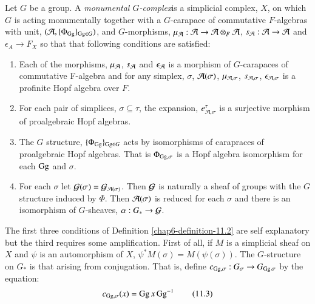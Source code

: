 \begin{definition}\label{chap6-definition-11.2}
Let $G$ be a group. A \textit{monumental $G$-complex}is a simplicial complex, $X$, on which $G$ is acting monumentally together with a $G$-carapace of commutative $F$-algebras with unit, $(\mathcal{A}, \{\Phi_{\operatorname{Gg}}\}_{\operatorname{Gg} \in G})$, and $G$-morphisms, $\mu_{\mathcal{A}} : \mathcal{A} \rightarrow \mathcal{A} \otimes_{F} \mathcal{A}$, $s_{\mathcal{A}} : \mathcal{A} \rightarrow \mathcal{A}$ and $\epsilon_{A} \rightarrow F_{X}$ so that that following conditions are satisfied:
\begin{enumerate}[{\rm(1)}]
\item Each of the morphisms, $\mu_{\mathcal{A}}$, $s_{\mathcal{A}}$ and $\epsilon_{\mathcal{A}}$ is a morphism of $G$-carapaces of commutative F-algebra and for any simplex, $\sigma$, $\mathcal{A}(\sigma)$, $\mu_{\mathcal{A}, \sigma}$, $s_{\mathcal{A}, \sigma}$, $\epsilon_{\mathcal{A}, \sigma}$ is a profinite Hopf algebra over $F$.\label{chap6-definition11.2-enum-1}

\item For each pair of simplices, $\sigma \subseteq \tau$, the expansion, $e_{\mathcal{A}, \sigma}^{\tau}$ is a surjective morphism of proalgebraic Hopf algebras.\label{chap6-definition11.2-enum-2}

\item The $G$ structure, $\{\Phi_{\operatorname{Gg}}\}_{\operatorname{Gg} \in G}$ acts by isomorphisms of carapraces of proalgebraic Hopf algebras. That is $\Phi_{\operatorname{Gg}, \sigma}$ is a Hopf algebra isomorphism for each $\operatorname{Gg}$ and $\sigma$.\label{chap6-definition11.2-enum-3}

\item For each $\sigma$ let $\mathcal{G}(\sigma) =\mathcal{G}_{\mathcal{A}(\sigma)}$. Then $\mathcal{G}$ is naturally a sheaf of groups with the $G$ structure induced by $\Phi$. Then $\mathcal{A}(\sigma)$ is reduced for each $\sigma$ and there is an isomorphism of $G$-sheaves, $\alpha : G_{*} \rightarrow \mathcal{G}$.\label{chap6-definition11.2-enum-4}
\end{enumerate}
\end{definition}

The first three conditions of Definition \ref{chap6-definition-11.2} are self explanatory but the third requires some amplification. First of all, if $M$ is a simplicial sheaf on $X$ and $\psi$ is an automorphism of $X$, $\psi^{*}M(\sigma) = M(\psi(\sigma))$. The $G$-structure on $G_{*}$ is that arising from conjugation. That is, define $c_{\operatorname{Gg}, \sigma} : G_{\sigma} \rightarrow G_{\operatorname{Gg} \sigma}$ by the equation:
\begin{equation*}\label{chap6-eq-11.3}
c_{\operatorname{Gg},\sigma}(x) = \operatorname{Gg} x \operatorname{Gg}^{-1}\tag{11.3}
\end{equation*}

